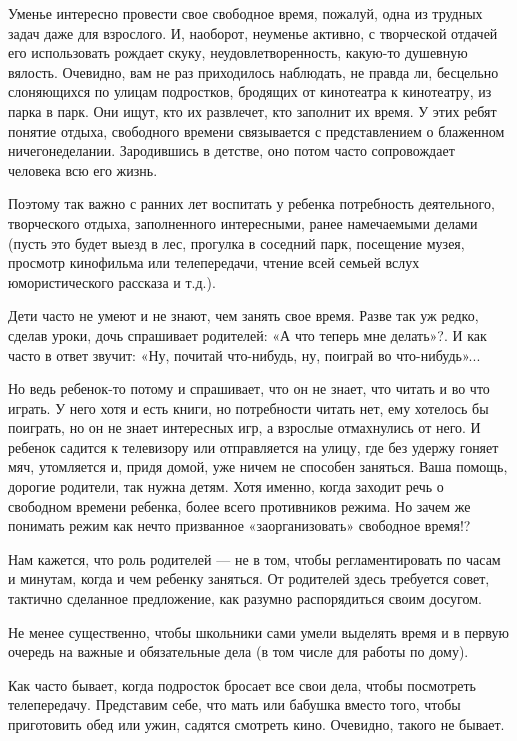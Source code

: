 \documentclass[12pt, a4paper, openany]{book}
\begin{document}
Уменье интересно провести свое свободное время, пожалуй, одна из трудных задач даже для взрослого. И, наоборот, неуменье активно, с творческой отдачей его использовать рождает скуку, неудовлетворенность, какую-то душевную вялость. Очевидно, вам не раз приходилось наблюдать, не правда ли, бесцельно слоняющихся по улицам подростков, бродящих от кинотеатра к кинотеатру, из парка в парк. Они ищут, кто их развлечет, кто заполнит их время. У этих ребят понятие отдыха, свободного времени связывается с представлением о блаженном ничегонеделании. Зародившись в детстве, оно потом часто сопровождает человека всю его жизнь. 


Поэтому так важно с ранних лет воспитать у ребенка потребность деятельного, творческого отдыха, заполненного интересными, ранее намечаемыми делами (пусть это будет выезд в лес, прогулка в соседний парк, посещение музея, просмотр кинофильма или телепередачи, чтение всей семьей вслух юмористического рассказа и т.д.). 

Дети часто не умеют и не знают, чем занять свое время. Разве так уж редко, сделав уроки, дочь спрашивает родителей: «А что теперь мне делать»?. И как часто в ответ звучит: «Ну, почитай что-нибудь, ну, поиграй во что-нибудь»... 

Но ведь ребенок-то потому и спрашивает, что он не знает, что читать и во что играть. У него хотя и есть книги, но потребности читать нет, ему хотелось бы поиграть, но он не знает интересных игр, а взрослые отмахнулись от него. И ребенок садится к телевизору или отправляется на улицу, где без удержу гоняет мяч, утомляется и, придя домой, уже ничем не способен заняться. Ваша помощь, дорогие родители, так нужна детям. Хотя именно, когда заходит речь о свободном времени ребенка, более всего противников режима. Но зачем же понимать режим как нечто призванное «заорганизовать» свободное время!? 

Нам кажется, что роль родителей — не в том, чтобы регламентировать по часам и минутам, когда и чем ребенку заняться. От родителей здесь требуется совет, тактично сделанное предложение, как разумно распорядиться своим досугом. 

Не менее существенно, чтобы школьники сами умели выделять время и в первую очередь на важные и обязательные дела (в том числе для работы по дому). 

Как часто бывает, когда подросток бросает все свои дела, чтобы посмотреть телепередачу. Представим себе, что мать или бабушка вместо того, чтобы приготовить обед или ужин, садятся смотреть кино. Очевидно, такого не бывает. 
\end{document}
